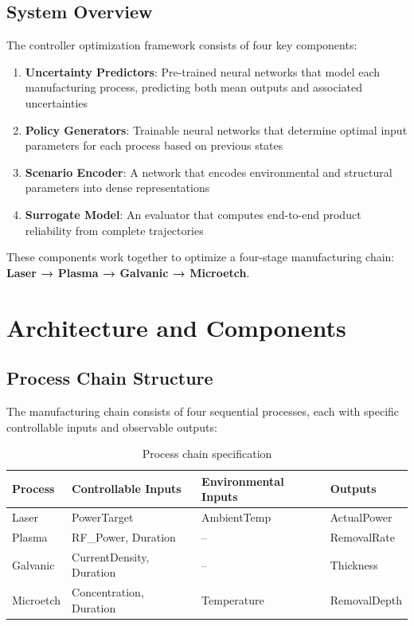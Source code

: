 \documentclass[11pt,a4paper]{article}
\begin{document}
\subsection{System Overview}

The controller optimization framework consists of four key components:

\begin{enumerate}
    \item \textbf{Uncertainty Predictors}: Pre-trained neural networks that model each manufacturing process, predicting both mean outputs and associated uncertainties
    \item \textbf{Policy Generators}: Trainable neural networks that determine optimal input parameters for each process based on previous states
    \item \textbf{Scenario Encoder}: A network that encodes environmental and structural parameters into dense representations
    \item \textbf{Surrogate Model}: An evaluator that computes end-to-end product reliability from complete trajectories
\end{enumerate}

These components work together to optimize a four-stage manufacturing chain: \textbf{Laser → Plasma → Galvanic → Microetch}.

\section{Architecture and Components}

\subsection{Process Chain Structure}

The manufacturing chain consists of four sequential processes, each with specific controllable inputs and observable outputs:

\begin{table}[h!]
\centering
\begin{tabular}{@{}llll@{}}
\toprule
\textbf{Process} & \textbf{Controllable Inputs} & \textbf{Environmental Inputs} & \textbf{Outputs} \\ \midrule
Laser & PowerTarget & AmbientTemp & ActualPower \\
Plasma & RF\_Power, Duration & -- & RemovalRate \\
Galvanic & CurrentDensity, Duration & -- & Thickness \\
Microetch & Concentration, Duration & Temperature & RemovalDepth \\ \bottomrule
\end{tabular}
\caption{Process chain specification}
\end{table}
\end{document}
